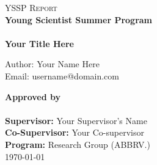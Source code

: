 
\begin{titlepage} 
	
	\thispagestyle{firstpage}
	\newcommand{\HRule}{\rule{\linewidth}{0.5mm}} 
	
	
	
	
	
	
	\begin{flushleft}
	

	\vspace*{1in}
	\textsc{\Large YSSP Report}\\[0.5cm] 
	\textbf{\Large Young Scientist Summer Program}\\[0.5cm]
	{\color{NavyBlue}{\rule{6in}{0.75mm}}}\\
	
	{\huge\bfseries Your Title Here\\} %
	
	\large Author: Your Name Here\\
	\large Email:  username@domain.com
	
	\vspace*{0.35in}
	
	{\Large\bfseries Approved by}\\
	
	{\color{NavyBlue}{\rule{6in}{0.75mm}}}\\


	\vspace*{0.25in}
	{\large\textbf{Supervisor:}} Your Supervisor's Name
	\\
	{\large\textbf{Co-Supervisor:}} Your Co-supervisor
	\\
	{\large\textbf{Program:}} Research Group (ABBRV.)
	\\
	{\large\today} %
	\\
	\vspace*{0.25in}
	

\end{flushleft}
\end{titlepage}
